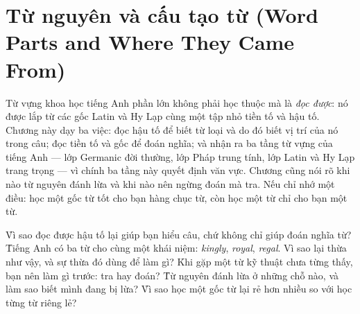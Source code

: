\documentclass[../../english.tex]{subfiles}
\begin{document}
\chapter{Từ nguyên và cấu tạo từ (Word Parts and Where They Came From)}

\begin{tomtat}
Từ vựng khoa học tiếng Anh phần lớn không phải học thuộc mà là \emph{đọc được}: nó được lắp từ các gốc Latin và Hy Lạp cùng một tập nhỏ tiền tố và hậu tố. Chương này dạy ba việc: đọc hậu tố để biết từ loại và do đó biết vị trí của nó trong câu; đọc tiền tố và gốc để đoán nghĩa; và nhận ra ba tầng từ vựng của tiếng Anh --- lớp Germanic đời thường, lớp Pháp trung tính, lớp Latin và Hy Lạp trang trọng --- vì chính ba tầng này quyết định văn vực. Chương cũng nói rõ khi nào từ nguyên đánh lừa và khi nào nên ngừng đoán mà tra. Nếu chỉ nhớ một điều: học một gốc từ tốt cho bạn hàng chục từ, còn học một từ chỉ cho bạn một từ.
\end{tomtat}

\begin{nentang}
\end{nentang}

\begin{khoigoi}
\h{Vì sao đọc được hậu tố lại giúp bạn hiểu câu, chứ không chỉ giúp đoán nghĩa từ?}
\h{Tiếng Anh có ba từ cho cùng một khái niệm: \emph{kingly}, \emph{royal}, \emph{regal}. Vì sao lại thừa như vậy, và sự thừa đó dùng để làm gì?}
\h{Khi gặp một từ kỹ thuật chưa từng thấy, bạn nên làm gì trước: tra hay đoán?}
\h{Từ nguyên đánh lừa ở những chỗ nào, và làm sao biết mình đang bị lừa?}
\h{Vì sao học một gốc từ lại rẻ hơn nhiều so với học từng từ riêng lẻ?}
\end{khoigoi}
\end{document}
